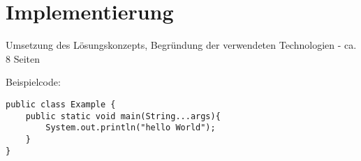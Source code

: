 \chapter{Implementierung}
\thispagestyle{fancy}

Umsetzung des Lösungskonzepts, Begründung der verwendeten Technologien - ca. 8 Seiten

Beispielcode:

\begin{lstlisting}[caption=Example]
public class Example {
	public static void main(String...args){
		System.out.println("hello World");
	}
}
\end{lstlisting}

